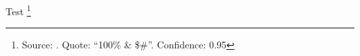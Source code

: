 \documentclass{memoir}
\begin{document}
Test \footnote{Source: \cite{ho2020}. Quote: ``100\% \& \$\#''. Confidence: 0.95}
\end{document}
